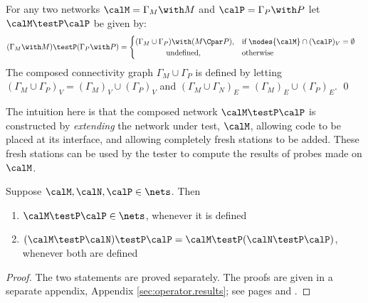 \documentclass{LMCS}
\begin{document}
\begin{defi}\label{def:comp.nets}
For any two networks $\calM = \Gamma_M \with M$ and $\calP = \Gamma_P
\with P$
let $\calM \testP \calP$ be given by:
\begin{align*}
    &(\Gamma_M \with M ) \testP (\Gamma_P \with P) = 
    \begin{cases}
        (\Gamma_M \cup \Gamma_P) \with (M \Cpar P), & \text{if}\;  \nodes{\calM} \cap (\calP)_V =
  \emptyset\\
        \qquad\qquad\text{undefined},                          &\text{otherwise}
    \end{cases} 
\end{align*}
The composed connectivity graph $\Gamma_M \cup \Gamma_P$ 
is defined by letting $(\Gamma_M \cup \Gamma_P)_V = (\Gamma_M)_V 
\cup (\Gamma_P)_V$ and  $(\Gamma_M \cup \Gamma_N)_E = (\Gamma_M)_E \cup (\Gamma_P)_E$.
\qed 
\end{defi}
\noindent
The intuition here is that the composed network $\calM \testP \calP$
is constructed by \emph{extending} the network under test, $\calM$,
allowing code to be placed at its interface, and allowing completely
fresh stations to be added. These fresh stations can be used by the
tester to compute the results of probes made on $\calM$. 

\begin{prop}
\label{prop:testp.assoc}
Suppose $\calM, \calN, \calP  \in \nets$. 
Then 
\begin{enumerate}
\item $\calM \testP \calP  \in
  \nets$, whenever it is defined 

\item $(\calM \testP \calN)  \testP \calP  = 
 \calM \testP (\calN  \testP \calP )$, whenever both are defined 
\end{enumerate}
\end{prop} 
\begin{proof}
The two statements are proved separately. The proofs are given 
in a  separate appendix, Appendix \ref{sec:operator.results}; 
see pages \pageref{proof:testP.closed} and \pageref{proof:testP.assoc}.
\end{proof}
\end{document}
